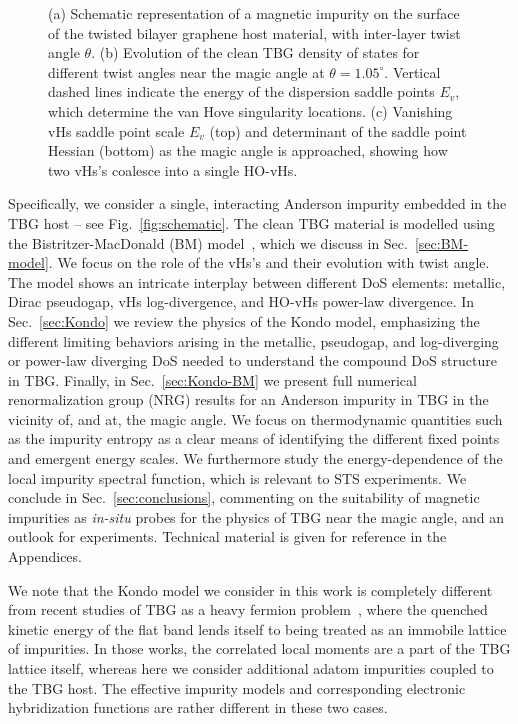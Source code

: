 \begin{figure}[t!]
\begin{subfigure}[b]{0.300\linewidth}
		\caption{{\label{fig:ShowHigherOrder}}}
	\end{subfigure}
	\caption{ %
		  (a) Schematic representation of a magnetic impurity on the surface of the twisted bilayer graphene host material, with inter-layer twist angle $\theta$.   (b) Evolution of the clean TBG density of states for different twist angles near the magic angle at $\theta = 1.05^{\circ}$. Vertical dashed lines indicate the energy of the dispersion saddle points $E_v$, which determine the van Hove singularity locations. (c) Vanishing vHs saddle point scale $E_v$ (top) and determinant of the saddle point Hessian (bottom) as the magic angle is approached, showing how two vHs's coalesce into a single HO-vHs. }
	\label{fig:joinedfig}
\end{figure}


Specifically, we consider a single, interacting Anderson impurity embedded in the TBG host -- see Fig.~\ref{fig:schematic}. The clean TBG material is modelled using the Bistritzer-MacDonald (BM) model~\cite{Bistritzer2011}, which we discuss in Sec.~\ref{sec:BM-model}. We focus on the role of the vHs's and their evolution with twist angle. The model shows an intricate interplay between different DoS elements: metallic, Dirac pseudogap, vHs log-divergence, and HO-vHs power-law divergence. In Sec.~\ref{sec:Kondo} we review the physics of the Kondo model, emphasizing the different limiting behaviors arising in the metallic, pseudogap, and log-diverging or power-law diverging DoS needed to understand the compound DoS structure in TBG. Finally, in Sec.~\ref{sec:Kondo-BM} we present full numerical renormalization group (NRG) results for an Anderson impurity in TBG in the vicinity of, and at, the magic angle. We focus on thermodynamic quantities such as the impurity entropy as a clear means of identifying the different fixed points and emergent energy scales. We furthermore study the energy-dependence of the local impurity spectral function, which is relevant to STS experiments. We conclude in Sec.~\ref{sec:conclusions}, commenting on the suitability of magnetic impurities as \textit{in-situ} probes for the physics of TBG near the magic angle, and an outlook for experiments. Technical material is given for reference in the Appendices. 

We note that the Kondo model we consider in this work is completely different from recent studies of TBG as a heavy fermion problem~\cite{song2022magic,hu2023kondo,hu2023symmetric,zhou2023kondo}, where the quenched kinetic energy of the flat band lends itself to being treated as an immobile lattice of impurities. In those works, the correlated local moments are a part of the TBG lattice itself, whereas here we consider additional adatom impurities coupled to the TBG host. The effective impurity models and corresponding electronic hybridization functions are rather different in these two cases.



